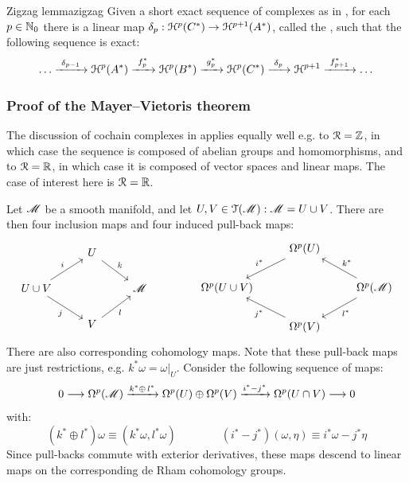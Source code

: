 \begin{lemma}{Zigzag lemma}{zigzag}
  Given a short exact sequence of complexes as in , for each $ p \in \mathbb{N}_0 $ there is a linear map $ \delta_p : \EuScript{H}^{p}(C^*) \rightarrow \EuScript{H}^{p+1}(A^*) $, called the , such that the following sequence is exact:
  \begin{equation*}
    \dots \xrightarrow{\ \delta_{p-1} \ } \EuScript{H}^{p}(A^*) \xrightarrow{\ f_p^* \ } \EuScript{H}^{p}(B^*) \xrightarrow{\ g_p^* \ } \EuScript{H}^{p}(C^*) \xrightarrow{\ \delta_p \ } \EuScript{H}^{p+1} \xrightarrow{\ f_{p+1}^* \ } \dots
  \end{equation*}
\end{lemma}

\subsubsection{Proof of the Mayer--Vietoris theorem}

The discussion of cochain complexes in  applies equally well e.g. to $ \EuScript{R} = \mathbb{Z} $, in which case the sequence is composed of abelian groups and homomorphisms, and to $ \EuScript{R} = \mathbb{R} $, in which case it is composed of vector spaces and linear maps. The case of interest here is $ \EuScript{R} = \mathbb{R} $.

Let $ \mathscr{M} $ be a smooth manifold, and let $ U,V \in \EuScript{T}(\mathscr{M}) : \mathscr{M} = U \cup V $. There are then four inclusion maps and four induced pull-back maps:
\begin{equation*}
  \begin{tikzcd}
    & U \ar[rd , "k"] & \\
    U \cup V \ar[ru , "i"] \ar[rd , "j" , swap] & & \man \\
                                                & V \ar[ru , "l" , swap] &
  \end{tikzcd}
  \qquad \qquad
  \begin{tikzcd}
    & \dfm{p}(U) \ar[ld , "i^*" , swap] & \\
    \dfm{p}(U \cup V)  & & \df{p} \ar[lu , "k^*" , swap] \ar[ld , "l^*"] \\
                       & \dfm{p}(V) \ar[lu , "j^*"] &
  \end{tikzcd}
\end{equation*}
There are also corresponding cohomology maps. Note that these pull-back maps are just restrictions, e.g. $ k^*\omega = \omega \vert_U $. Consider the following sequence of maps:
\begin{equation}
  0 \longrightarrow \Omega^{p}(\mathscr{M}) \xrightarrow{k^* \oplus \, l^*} \Omega^{p}(U) \oplus \Omega^{p}(V) \xrightarrow{i^* - j^*} \Omega^{p}(U \cap V) \longrightarrow 0
  \label{eq:mv-aux}
\end{equation}
with:
\begin{equation}
  (k^* \oplus l^*) \omega \equiv (k^* \omega , l^* \omega)
  \qquad \qquad
  (i^* - j^*) (\omega , \eta) \equiv i^* \omega - j^* \eta
\end{equation}
Since pull-backs commute with exterior derivatives, these maps descend to linear maps on the corresponding de Rham cohomology groups.

